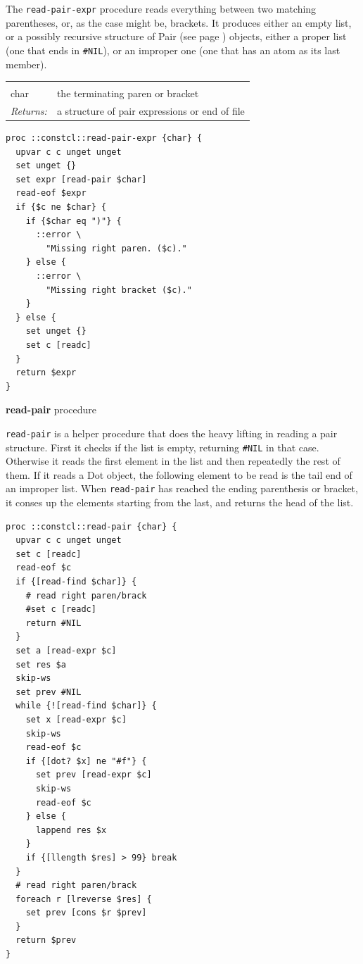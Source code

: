 \documentclass[twoside,9pt]{report}
\begin{document}
The \texttt{read-pair-expr} procedure reads everything between two matching parentheses, or, as the case might be, brackets. It produces either an empty list, or a possibly recursive structure of Pair (see page \pageref{pairs-and-lists}) objects, either a proper list (one that ends in \texttt{\#NIL}), or an improper one (one that has an atom as its last member).

\noindent\begin{tabular}{ |p{1.5cm} p{8cm}| }
\hline
\rowcolor[HTML]{CCCCCC} \multicolumn{2}{|l|}{\bf read-pair-expr (internal)} \\
char & the terminating paren or bracket \\
\textit{Returns:} & a structure of pair expressions or end of file \\
\hline
\end{tabular}
\begin{lstlisting}
proc ::constcl::read-pair-expr {char} {
  upvar c c unget unget
  set unget {}
  set expr [read-pair $char]
  read-eof $expr
  if {$c ne $char} {
    if {$char eq ")"} {
      ::error \
        "Missing right paren. ($c)."
    } else {
      ::error \
        "Missing right bracket ($c)."
    }
  } else {
    set unget {}
    set c [readc]
  }
  return $expr
}
\end{lstlisting}


\textbf{read-pair} procedure


\texttt{read-pair} is a helper procedure that does the heavy lifting in reading a pair structure. First it checks if the list is empty, returning \texttt{\#NIL} in that case. Otherwise it reads the first element in the list and then repeatedly the rest of them. If it reads a Dot object, the following element to be read is the tail end of an improper list. When \texttt{read-pair} has reached the ending parenthesis or bracket, it conses up the elements starting from the last, and returns the head of the list.

\index{read-pair}
\begin{lstlisting}
proc ::constcl::read-pair {char} {
  upvar c c unget unget
  set c [readc]
  read-eof $c
  if {[read-find $char]} {
    # read right paren/brack
    #set c [readc]
    return #NIL
  }
  set a [read-expr $c]
  set res $a
  skip-ws
  set prev #NIL
  while {![read-find $char]} {
    set x [read-expr $c]
    skip-ws
    read-eof $c
    if {[dot? $x] ne "#f"} {
      set prev [read-expr $c]
      skip-ws
      read-eof $c
    } else {
      lappend res $x
    }
    if {[llength $res] > 99} break
  }
  # read right paren/brack
  foreach r [lreverse $res] {
    set prev [cons $r $prev]
  }
  return $prev
}
\end{lstlisting}
\end{document}
